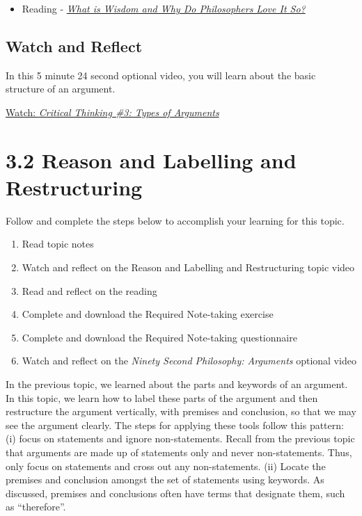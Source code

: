 \documentclass[
]{book}
\providecommand{\tightlist}{%
  \setlength{\itemsep}{0pt}\setlength{\parskip}{0pt}}
\begin{document}
\begin{itemize}
\tightlist
\item
  Reading - \href{assets/u1/PHIL-100-Nozick-What-is-Wisdom.pdf}{\emph{What is Wisdom and Why Do Philosophers Love It So?}}
\end{itemize}

\hypertarget{watch-and-reflect-18}{%
\subsection*{Watch and Reflect}\label{watch-and-reflect-18}}

\begin{reflect}
In this 5 minute 24 second optional video, you will learn about the basic structure of an argument.

\href{https://www.youtube.com/watch?v=wbRxR53F3rI}{Watch: \emph{Critical Thinking \#3: Types of Arguments}}
\end{reflect}

\hypertarget{reason-and-labelling-and-restructuring}{%
\section*{3.2 Reason and Labelling and Restructuring}\label{reason-and-labelling-and-restructuring}}

Follow and complete the steps below to accomplish your learning for this topic.

\begin{enumerate}
\def\labelenumi{\arabic{enumi}.}
\tightlist
\item
  Read topic notes
\item
  Watch and reflect on the Reason and Labelling and Restructuring topic video
\item
  Read and reflect on the reading
\item
  Complete and download the Required Note-taking exercise
\item
  Complete and download the Required Note-taking questionnaire
\item
  Watch and reflect on the \emph{Ninety Second Philosophy: Arguments} optional video
\end{enumerate}

In the previous topic, we learned about the parts and keywords of an argument. In this topic, we learn how to label these parts of the argument and then restructure the argument vertically, with premises and conclusion, so that we may see the argument clearly. The steps for applying these tools follow this pattern: (i) focus on statements and ignore non-statements. Recall from the previous topic that arguments are made up of statements only and never non-statements. Thus, only focus on statements and cross out any non-statements. (ii) Locate the premises and conclusion amongst the set of statements using keywords. As discussed, premises and conclusions often have terms that designate them, such as ``therefore''.
\end{document}
